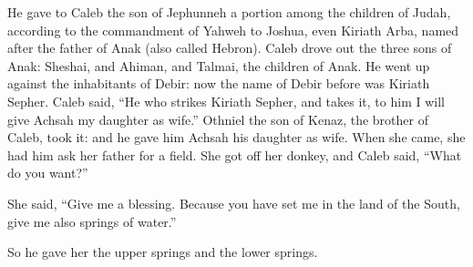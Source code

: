 \begin{paracol}{2}
\begin{otherlanguage}{english}
 He gave to Caleb the son of Jephunneh a portion among
the children of Judah, according to the commandment of Yahweh to Joshua,
even Kiriath Arba, named after the father of Anak (also called Hebron).
 Caleb drove out the three sons of Anak: Sheshai, and
Ahiman, and Talmai, the children of Anak.  He went up
against the inhabitants of Debir: now the name of Debir before was
Kiriath Sepher.  Caleb said, ``He who strikes Kiriath
Sepher, and takes it, to him I will give Achsah my daughter as wife.''
 Othniel the son of Kenaz, the brother of Caleb, took it:
and he gave him Achsah his daughter as wife.  When she
came, she had him ask her father for a field. She got off her donkey,
and Caleb said, ``What do you want?''

 She said, ``Give me a blessing. Because you have set me
in the land of the South, give me also springs of water.''

So he gave her the upper springs and the lower springs.


\end{otherlanguage}
\end{paracol}
